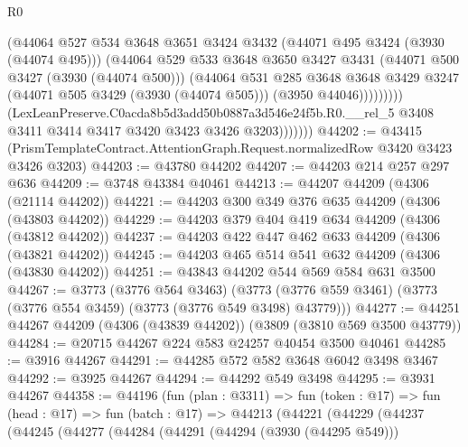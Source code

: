\begin{lexlean}{R0}
\begin{coremodule}
                          (@44064
                            @527
                            @534
                            @3648
                            @3651
                            @3424
                            @3432
                            (@44071 @495 @3424 (@3930 (@44074 @495)))
                            (@44064
                              @529
                              @533
                              @3648
                              @3650
                              @3427
                              @3431
                              (@44071 @500 @3427 (@3930 (@44074 @500)))
                              (@44064
                                @531
                                @285
                                @3648
                                @3648
                                @3429
                                @3247
                                (@44071 @505 @3429 (@3930 (@44074 @505)))
                                (@3950 @44046)))))))))
                (LexLeanPreserve.C0acda8b5d3add50b0887a3d546e24f5b.R0.__rel_5
                  @3408
                  @3411
                  @3414
                  @3417
                  @3420
                  @3423
                  @3426
                  @3203)))))))
@44202 := @43415
    (PrismTemplateContract.AttentionGraph.Request.normalizedRow @3420 @3423 @3426 @3203)
@44203 := @43780 @44202
@44207 := @44203 @214 @257 @297 @636
@44209 := @3748 @43384 @40461
@44213 := @44207 @44209 (@4306 (@21114 @44202))
@44221 := @44203 @300 @349 @376 @635 @44209 (@4306 (@43803 @44202))
@44229 := @44203 @379 @404 @419 @634 @44209 (@4306 (@43812 @44202))
@44237 := @44203 @422 @447 @462 @633 @44209 (@4306 (@43821 @44202))
@44245 := @44203 @465 @514 @541 @632 @44209 (@4306 (@43830 @44202))
@44251 := @43843 @44202 @544 @569 @584 @631 @3500
@44267 := @3773
    (@3776 @564 @3463)
    (@3773 (@3776 @559 @3461) (@3773 (@3776 @554 @3459) (@3773 (@3776 @549 @3498) @43779)))
@44277 := @44251 @44267 @44209 (@4306 (@43839 @44202)) (@3809 (@3810 @569 @3500 @43779))
@44284 := @20715 @44267 @224 @583 @24257 @40454 @3500 @40461
@44285 := @3916 @44267
@44291 := @44285 @572 @582 @3648 @6042 @3498 @3467
@44292 := @3925 @44267
@44294 := @44292 @549 @3498
@44295 := @3931 @44267
@44358 := @44196
    (fun (plan : @3311) =>
    fun (token : @17) =>
    fun (head : @17) =>
    fun (batch : @17) =>
    @44213
      (@44221
        (@44229
          (@44237
            (@44245
              (@44277
                (@44284
                  (@44291
                    (@44294 (@3930 (@44295 @549)))

\end{coremodule}
\end{lexlean}
